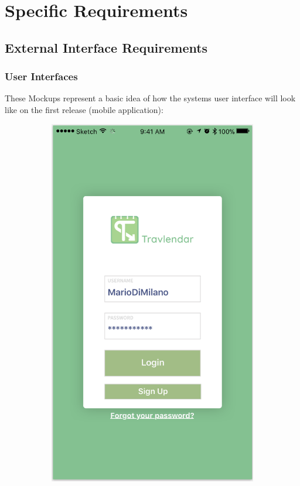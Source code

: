 \documentclass[12pt]{article}
\begin{document}
\section{Specific Requirements}

\subsection{External Interface Requirements}

\subsubsection{User Interfaces}
These Mockups represent a basic idea of how the systems user interface will look like on the first release (mobile application):

\begin{figure}[H]
\centering
    \begin{subfigure}{.4\textwidth}
        \includegraphics[scale=0.44]{interfaceLogin.png}

\end{subfigure}
\end{figure}
\end{document}
